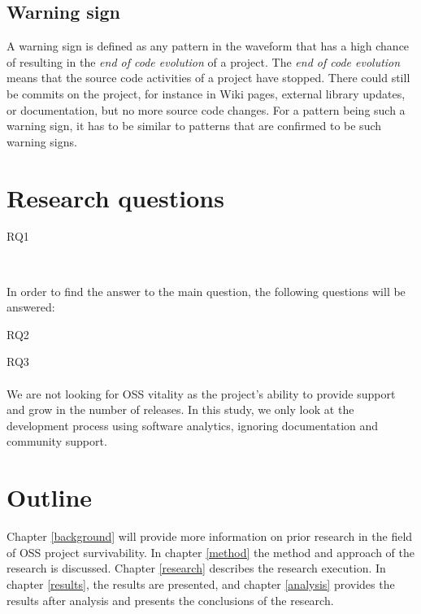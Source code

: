 \subsection{Warning sign}
A warning sign is defined as any pattern in the waveform that has a high chance
of resulting in the \emph{end of code evolution }\rm of a project. The
\emph{end of code evolution }\rm means that the source code activities of a
project have stopped. There could still be commits on the project, for instance
in Wiki pages, external library updates, or documentation, but no more source
code changes. For a pattern being such a warning sign, it has to be similar to
patterns that are confirmed to be such warning signs.



\section{Research questions}
\label{questions}

\begin{description}
	\item[RQ1\label{itm:question_warningsigns}]
	\emph{\researchQuestion}\\[0.3cm]
\end{description}

\noindent
In order to find the answer to the main question, the following
questions will be answered:
\begin{description}
	\item[RQ2\label{itm:question_patterns}] \emph{\subQuestionOne}
	\item[RQ3\label{itm:question_successfailure}] \emph{\subQuestionTwo}
\end{description}

\paragraph{}
We are not looking for OSS vitality as the project's ability to provide support
and grow in the number of releases. In this study, we only look at the
development process using software analytics, ignoring documentation and
community support.

\section{Outline}

Chapter \ref{background} will provide more information on prior research in the
field of OSS project survivability. In chapter \ref{method} the method and
approach of the research is discussed. Chapter \ref{research} describes the
research execution. In chapter \ref{results}, the results are presented, and
chapter \ref{analysis} provides the results after analysis and presents the
conclusions of the research.

